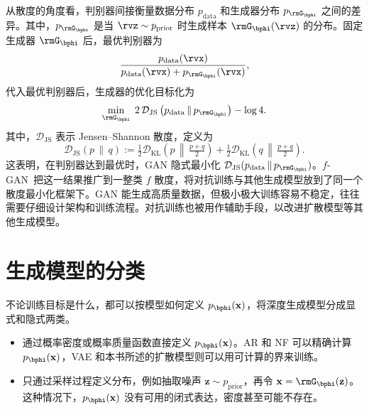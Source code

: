 从散度的角度看，判别器间接衡量数据分布 $p_{\mathrm{data}}$ 和生成器分布 $p_{\rmG_{\bphi}}$ 之间的差异。其中，$p_{\rmG_{\bphi}}$ 是当 $\rvz \sim p_{\mathrm{prior}}$ 时生成样本 $\rmG_{\bphi}(\rvz)$ 的分布。固定生成器 $\rmG_{\bphi}$ 后，最优判别器为
\begin{equation*}
     \frac{p_{\mathrm{data}}(\rvx)}{p_{\mathrm{data}}(\rvx) + p_{\rmG_{\bphi}}(\rvx)},
\end{equation*}
代入最优判别器后，生成器的优化目标化为
\begin{equation*}
    \min_{\rmG_{\bphi}} \; 2\,\mathcal{D}_\mathrm{JS} \left(p_{\mathrm{data}} \,\|\, p_{\rmG_\bphi}\right) - \log 4.
\end{equation*}
其中，$\mathcal{D}_\mathrm{JS}$ 表示 Jensen--Shannon 散度，定义为
\begin{equation*}
    \mathcal{D}_\mathrm{JS}(p \,\|\, q) 
    := \tfrac{1}{2} \mathcal{D}_\mathrm{KL} \left(p \,\middle\|\, \tfrac{p+q}{2}\right) 
    + \tfrac{1}{2} \mathcal{D}_\mathrm{KL} \left(q \,\middle\|\, \tfrac{p+q}{2}\right).
\end{equation*}
这表明，在判别器达到最优时，GAN 隐式最小化 $\mathcal{D}_\mathrm{JS}(p_{\mathrm{data}} \,\|\, p_{\rmG_\bphi})$。$f$-GAN~\citep{nowozin2016f}把这一结果推广到一整类 $f$ 散度，将对抗训练与其他生成模型放到了同一个散度最小化框架下。GAN 能生成高质量数据，但极小极大训练容易不稳定，往往需要仔细设计架构和训练流程。对抗训练也被用作辅助手段，以改进扩散模型等其他生成模型。


\section{生成模型的分类}\label{sec:taxonomy}


不论训练目标是什么，都可以按模型如何定义 $p_\bphi(\mathbf{x})$，将深度生成模型分成显式和隐式两类。

\begin{itemize}
  \item {} 通过概率密度或概率质量函数直接定义 $p_\bphi(\mathbf{x})$。AR 和 NF 可以精确计算 $p_\bphi(\mathbf{x})$，VAE 和本书所述的扩散模型则可以用可计算的界来训练。

  \item {} 只通过采样过程定义分布，例如抽取噪声 $\mathbf{z} \sim p_{\mathrm{prior}}$，再令 $\mathbf{x} = \rmG_\bphi(\mathbf{z})$。这种情况下，$p_\bphi(\mathbf{x})$ 没有可用的闭式表达，密度甚至可能不存在。
\end{itemize}


